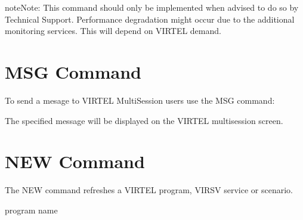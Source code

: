 \documentclass[letterpaper,10pt,english]{sphinxmanual}
\begin{document}
\begin{sphinxadmonition}{note}{Note:}
\sphinxAtStartPar
This command should only be implemented when advised to do so by Technical Support. Performance degradation might occur due to the additional monitoring services. This will depend on VIRTEL demand.
\end{sphinxadmonition}

\newpage

\ignorespaces 

\section{MSG Command}
\label{\detokenize{audit_operations_ and_performance:msg-command}}\label{\detokenize{audit_operations_ and_performance:index-14}}
\sphinxAtStartPar
To send a mesage to VIRTEL Multi\sphinxhyphen{}Session users use the MSG command:

\begin{sphinxVerbatim}[commandchars=\\\{\}]
 
\end{sphinxVerbatim}

\sphinxAtStartPar
The specified message will be displayed on the VIRTEL multi\sphinxhyphen{}session screen.

\ignorespaces 

\section{NEW Command}
\label{\detokenize{audit_operations_ and_performance:new-command}}\label{\detokenize{audit_operations_ and_performance:index-15}}
\sphinxAtStartPar
The NEW command refreshes a VIRTEL program, VIRSV service or scenario.

\begin{sphinxVerbatim}[commandchars=\\\{\}]
\end{sphinxVerbatim}
\begin{description}
\sphinxAtStartPar
program name

\end{description}
\end{document}
